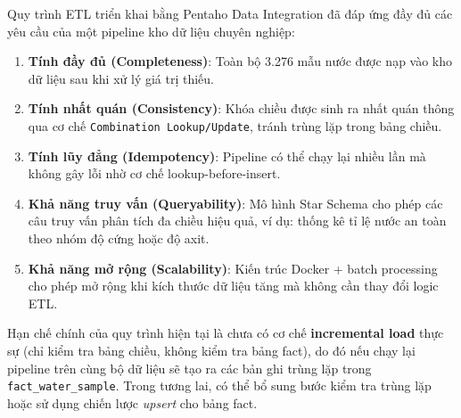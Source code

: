 Quy trình ETL triển khai bằng Pentaho Data Integration đã đáp ứng đầy đủ các yêu cầu của một pipeline kho dữ liệu chuyên nghiệp:

\begin{enumerate}
    \item \textbf{Tính đầy đủ (Completeness)}: Toàn bộ 3.276 mẫu nước được nạp vào kho dữ liệu sau khi xử lý giá trị thiếu.
    \item \textbf{Tính nhất quán (Consistency)}: Khóa chiều được sinh ra nhất quán thông qua cơ chế \texttt{Combination Lookup/Update}, tránh trùng lặp trong bảng chiều.
    \item \textbf{Tính lũy đẳng (Idempotency)}: Pipeline có thể chạy lại nhiều lần mà không gây lỗi nhờ cơ chế lookup-before-insert.
    \item \textbf{Khả năng truy vấn (Queryability)}: Mô hình Star Schema cho phép các câu truy vấn phân tích đa chiều hiệu quả, ví dụ: thống kê tỉ lệ nước an toàn theo nhóm độ cứng hoặc độ axit.
    \item \textbf{Khả năng mở rộng (Scalability)}: Kiến trúc Docker + batch processing cho phép mở rộng khi kích thước dữ liệu tăng mà không cần thay đổi logic ETL.
\end{enumerate}

Hạn chế chính của quy trình hiện tại là chưa có cơ chế \textbf{incremental load} thực sự (chỉ kiểm tra bảng chiều, không kiểm tra bảng fact), do đó nếu chạy lại pipeline trên cùng bộ dữ liệu sẽ tạo ra các bản ghi trùng lặp trong \texttt{fact\_water\_sample}. Trong tương lai, có thể bổ sung bước kiểm tra trùng lặp hoặc sử dụng chiến lược \textit{upsert} cho bảng fact.
